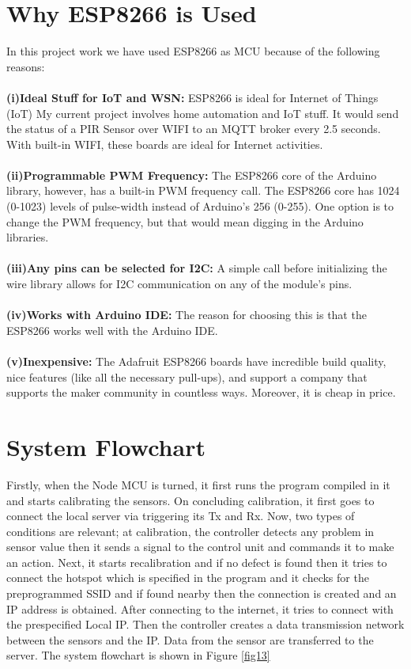 \section{Why ESP8266 is Used}
In this project work we have used ESP8266 as MCU because of the following reasons:\\\\
\textbf{(i)Ideal Stuff for IoT and WSN:} ESP8266 is ideal for Internet of Things (IoT) My current project involves home automation and IoT stuff. It would send the status of a PIR Sensor over WIFI to an MQTT broker every 2.5 seconds. With built-in WIFI, these boards are ideal for Internet activities.\\\\
\textbf{(ii)Programmable PWM Frequency:} The ESP8266 core of the Arduino library, however, has a built-in PWM frequency call. The ESP8266 core has 1024 (0-1023) levels of pulse-width instead of Arduino’s 256 (0-255). One option is to change the PWM frequency, but that would mean digging in the Arduino libraries.\\\\
\textbf{(iii)Any pins can be selected for I2C:} A simple call before initializing the wire library allows for I2C communication on any of the module’s pins.\\\\
\textbf{(iv)Works with Arduino IDE:} The reason for choosing this is that the ESP8266 works well with the Arduino IDE.\\\\
\textbf{(v)Inexpensive:} The Adafruit ESP8266 boards have incredible build quality, nice features (like all the necessary pull-ups), and support a company that supports the maker community in countless ways. Moreover, it is cheap in price.

\section{System Flowchart}
Firstly, when the Node MCU is turned, it first runs the program compiled in it and starts calibrating the sensors. On concluding calibration, it first goes to connect the local server via triggering its Tx and Rx. Now, two types of conditions are relevant; at calibration, the controller detects any problem in sensor value then it sends a signal to the control unit and commands it to make an action. Next, it starts recalibration and if no defect is found then it tries to connect the hotspot which is specified in the program and it checks for the preprogrammed SSID and if found nearby then the connection is created and an IP address is obtained. After connecting to the internet, it tries to connect with the prespecified Local IP. Then the controller creates a data transmission network between the sensors and the IP. Data from the sensor are transferred to the server. The system flowchart is shown in Figure \ref{fig13}

